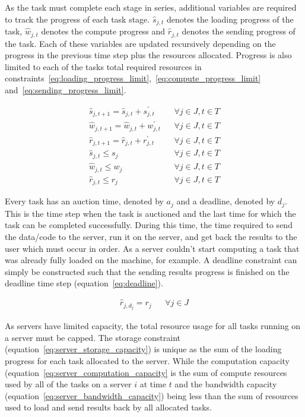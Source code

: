 As the task must complete each stage in series, additional variables are required to track the progress of
each task stage. $\hat{s}_{j,t}$ denotes the loading progress of the task, $\hat{w}_{j,t}$ denotes the compute progress
and $\hat{r}_{j,t}$ denotes the sending progress of the task. Each of these variables are updated recursively depending
on the progress in the previous time step plus the resources allocated. Progress is also limited to each of the tasks
total required resources in constraints~\eqref{eq:loading_progress_limit},~\eqref{eq:compute_progress_limit}
and~\eqref{eq:sending_progress_limit}.

\begin{align}
    \hat{s}_{j,t+1} = \hat{s}_{j,t} + s^{'}_{j,t} && \forall{j \in J, t \in T } \label{eq:loading_progress} \\
    \hat{w}_{j,t+1} = \hat{w}_{j,t} + w^{'}_{j,t} && \forall{j \in J, t \in T } \label{eq:compute_progress} \\
    \hat{r}_{j,t+1} = \hat{r}_{j,t} + r^{'}_{j,t} && \forall{j \in J, t \in T } \label{eq:sending_progress} \\
    \hat{s}_{j,t} \leq s_j && \forall{j \in J, t \in T} \label{eq:loading_progress_limit} \\
    \hat{w}_{j,t} \leq w_j && \forall{j \in J, t \in T} \label{eq:compute_progress_limit} \\
    \hat{r}_{j,t} \leq r_j && \forall{j \in J, t \in T} \label{eq:sending_progress_limit}
\end{align}

Every task has an auction time, denoted by $a_j$ and a deadline, denoted by $d_j$. This is the time step when the task
is auctioned and the last time for which the task can be completed successfully. During this time, the time required
to send the data/code to the server, run it on the server, and get back the results to the user which must occur in
order. As a server couldn't start computing a task that was already fully loaded on the machine, for example. A
deadline constraint can simply be constructed such that the sending results progress is finished on the deadline
time step (equation~\eqref{eq:deadline}).

\begin{align}
    \hat{r}_{j, d_j} = r_j && \forall{j \in J} \label{eq:deadline}
\end{align}

As servers have limited capacity, the total resource usage for all tasks running on a server must be capped.
The storage constraint (equation~\eqref{eq:server_storage_capacity}) is unique as the sum of the loading progress for
each task allocated to the server. While the computation capacity (equation~\eqref{eq:server_computation_capacity} is
the sum of compute resources used by all of the tasks on a server $i$ at time $t$ and the bandwidth capacity
(equation~\eqref{eq:server_bandwidth_capacity}) being less than the sum of resources used to load and send results back
by all allocated tasks.

